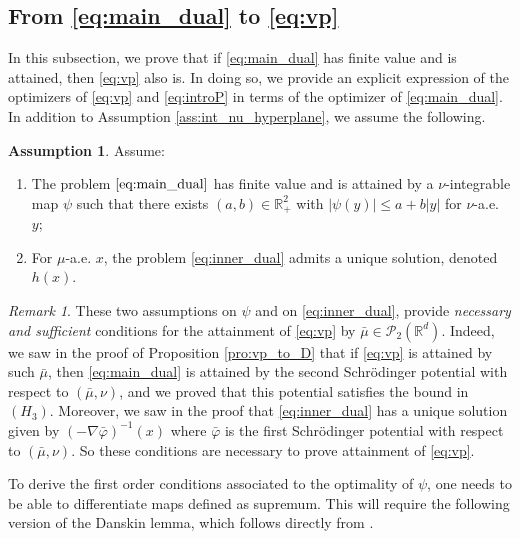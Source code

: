 \documentclass[reqno, a4paper]{amsart}
\theoremstyle{plain}
\theoremstyle{definition}
\newtheorem{assumption}[theorem]{Assumption}
\theoremstyle{remark}
\newtheorem{remark}[theorem]{Remark}
\numberwithin{equation}{section}
\numberwithin{theorem}{section}
\newcommand{\R}{\mathbb{R}}
\newcommand{\PP}{\mathcal{P}}
\begin{document}
	
	\subsection{From \eqref{eq:main_dual} to \eqref{eq:vp}}
	
	In this subsection, we prove that if \eqref{eq:main_dual} has finite value and is attained, then \eqref{eq:vp} also is. In doing so, we provide an explicit expression of the optimizers of \eqref{eq:vp} and \eqref{eq:introP} in terms of the optimizer of \eqref{eq:main_dual}. In addition to Assumption \eqref{ass:int_nu_hyperplane}, we assume the following.
	
	\begin{assumption}\label{ass:exp_affine_unique}
		Assume:
		\begin{enumerate}
			\item[\textnormal{(H3)}] The problem $\eqref{eq:main_dual}$ has finite value and is attained by a $\nu$-integrable map $\psi$ such that there exists $(a,b) \in \R_+^2$ with $|\psi(y)| \le a+b|y|$ for $\nu$-a.e.\ $y$;
			\item[\textnormal{(H4)}]\label{H4} For $\mu$-a.e. $x$, the problem \ref{eq:inner_dual}	admits a unique solution, denoted $h(x)$.
		\end{enumerate}
	\end{assumption}
	
	\begin{remark}
		These two assumptions on \(\psi\) and on \eqref{eq:inner_dual}, provide \emph{necessary and sufficient} conditions for the attainment of \eqref{eq:vp} by $\bar \mu \in \PP_2(\R^d)$. Indeed, we saw in the proof of Proposition \ref{pro:vp_to_D} that if \eqref{eq:vp} is attained by such $\bar \mu$, then \eqref{eq:main_dual} is attained by the second Schrödinger potential with respect to $(\bar \mu,\nu)$, and we proved that this potential satisfies the bound in $(H_3)$. Moreover, we saw in the proof that \eqref{eq:inner_dual} has a unique solution given by $(-\nabla \bar\varphi)^{-1} (x)$ where $\bar\varphi$ is the first Schrödinger potential with respect to $(\bar \mu,\nu)$. So these conditions are necessary to prove attainment of \eqref{eq:vp}. 
	\end{remark}
	
	To derive the first order conditions associated to the optimality of $\psi$, one needs to be able  to differentiate maps defined as supremum. This will require the following version of the Danskin lemma, which follows directly from \cite[Corollary~4]{MiSe02}.
	
\end{document}
